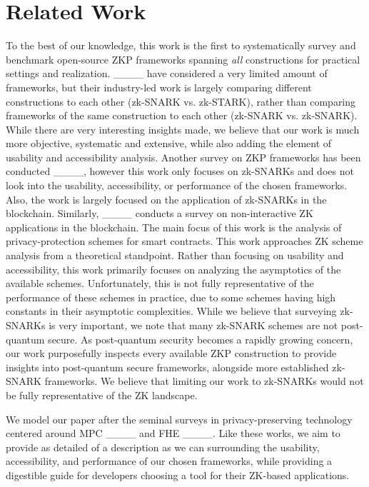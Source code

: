 \section{Related Work}
To the best of our knowledge, this work is the first to systematically survey and benchmark open-source ZKP frameworks spanning \textit{all} constructions for practical settings and realization. ____ have considered a very limited amount of frameworks, but their industry-led work is largely comparing different constructions to each other (zk-SNARK vs. zk-STARK), rather than comparing frameworks of the same construction to each other (zk-SNARK vs. zk-SNARK). While there are very interesting insights made, we believe that our work is much more objective, systematic and extensive, while also adding the element of usability and accessibility analysis.
Another survey on ZKP frameworks has been conducted ____, however this work only focuses on zk-SNARKs and does not look into the usability, accessibility, or performance of the chosen frameworks. Also, the work is largely focused on the application of zk-SNARKs in the blockchain. Similarly, ____ conducts a survey on non-interactive ZK applications in the blockchain. The main focus of this work is the analysis of privacy-protection schemes for smart contracts. This work approaches ZK scheme analysis from a theoretical standpoint. Rather than focusing on usability and accessibility, this work primarily focuses on analyzing the asymptotics of the available schemes. Unfortunately, this is not fully representative of the performance of these schemes in practice, due to some schemes having high constants in their asymptotic complexities. While we believe that surveying zk-SNARKs is very important, we note that many zk-SNARK schemes are not post-quantum secure. As post-quantum security becomes a rapidly growing concern, our work purposefully inspects every available ZKP construction to provide insights into post-quantum secure frameworks, alongside more established zk-SNARK frameworks. We believe that limiting our work to zk-SNARKs would not be fully representative of the ZK landscape.

We model our paper after the seminal surveys in privacy-preserving technology centered around MPC ____ and FHE ____. 
Like these works, we aim to provide as detailed of a description as we can surrounding the usability, accessibility, and performance of our chosen frameworks, while providing a digestible guide for developers choosing a tool for their ZK-based applications.